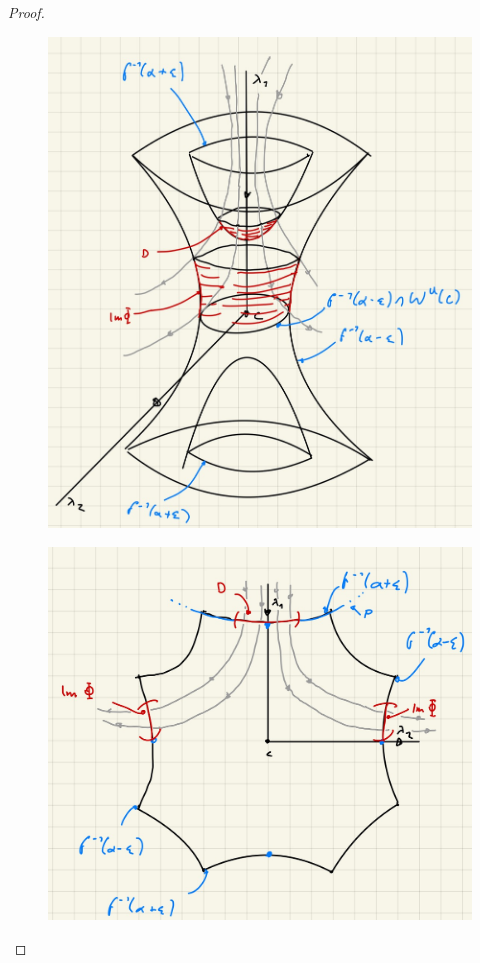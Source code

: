 \begin{proof}
    \begin{figure}
        \centering
        \begin{minipage}{.5\textwidth}
          \centering
          \includegraphics[width=.85\linewidth]{../resources/bew-gebrochene-trajektorien-sind-1-dim-mannigfaltigkeit-1.JPG}
          \label{fig: test1}
        \end{minipage}%
        \begin{minipage}{.5\textwidth}
          \centering
          \includegraphics[width=.85\linewidth]{../resources/bew-gebrochene-trajektorien-sind-1-dim-mannigfaltigkeit-2.JPG}
          \label{fig: test2}
        \end{minipage}
    \end{figure}


\end{proof}
